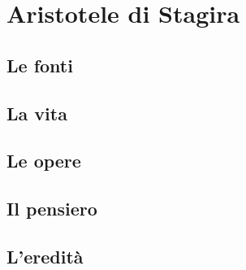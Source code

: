 \chapter{Aristotele di Stagira}

\section{Le fonti}

\section{La vita}

\section{Le opere}

\section{Il pensiero}

\section{L'eredità}
